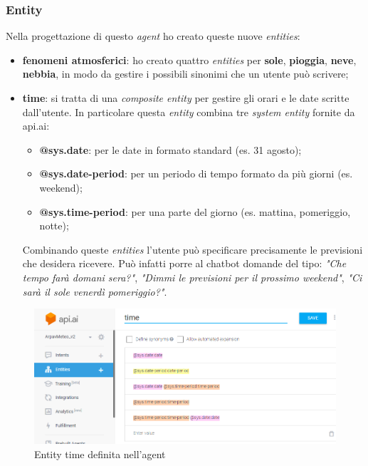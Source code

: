 \subsubsection{Entity}
Nella progettazione di questo \emph{agent} ho creato queste nuove \emph{entities}:
\begin{itemize}
	\item \textbf{fenomeni atmosferici}: ho creato quattro \emph{entities} per \textbf{sole}, \textbf{pioggia}, \textbf{neve}, \textbf{nebbia}, in modo da gestire i possibili sinonimi che un utente può scrivere;
	\item \textbf{time}: si tratta di una \emph{composite entity} per gestire gli orari e le date scritte dall'utente. In particolare questa \emph{entity} combina tre \emph{system entity} fornite da api.ai:
	\begin{itemize}
		\item \textbf{@sys.date}: per le date in formato standard (es. 31 agosto);
		\item \textbf{@sys.date-period}: per un periodo di tempo formato da più giorni (es. weekend);
		\item \textbf{@sys.time-period}: per una parte del giorno (es. mattina, pomeriggio, notte);
	\end{itemize}
Combinando queste \emph{entities} l'utente può specificare precisamente le previsioni che desidera ricevere. Può infatti porre al \gls{chatbot} domande del tipo: \emph{"Che tempo farà domani sera?"}, \emph{"Dimmi le previsioni per il prossimo weekend"}, \emph{"Ci sarà il sole venerdì pomeriggio?"}.
\end{itemize}
\begin{figure}[h!]
	\centering
	\includegraphics[scale=0.5]{../Immagini/time.png}
	\caption{Entity time definita nell'agent}
\end{figure}
\newpage
